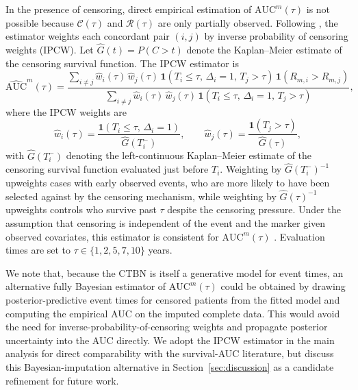 \documentclass[12pt]{article}
\begin{document}
In the presence of censoring, direct empirical estimation of $\mathrm{AUC}^m(\tau)$ is not possible because $\mathcal{C}(\tau)$ and $\mathcal{R}(\tau)$ are only partially observed. Following \citet{BlancheCommengesJacqmin-Gadda2013}, the estimator weights each concordant pair $(i,j)$ by inverse probability of censoring weights (IPCW). Let $\hat{G}(t) = P(C > t)$ denote the Kaplan--Meier estimate of the censoring survival function. The IPCW estimator is
\[
\widehat{\mathrm{AUC}}^m(\tau) = \frac{\displaystyle\sum_{i \neq j} \hat{w}_i(\tau)\, \hat{w}_j(\tau)\, \mathbf{1}(T_i \leq \tau,\, \Delta_i = 1,\, T_j > \tau)\, \mathbf{1}(R_{m,i} > R_{m,j})}{\displaystyle\sum_{i \neq j} \hat{w}_i(\tau)\, \hat{w}_j(\tau)\, \mathbf{1}(T_i \leq \tau,\, \Delta_i = 1,\, T_j > \tau)},
\]
where the IPCW weights are
\[
\hat{w}_i(\tau) = \frac{\mathbf{1}(T_i \leq \tau,\, \Delta_i = 1)}{\hat{G}(T_i^-)}, \qquad
\hat{w}_j(\tau) = \frac{\mathbf{1}(T_j > \tau)}{\hat{G}(\tau)},
\]
with $\hat{G}(T_i^-)$ denoting the left-continuous Kaplan--Meier estimate of the censoring survival function evaluated just before $T_i$. Weighting by $\hat{G}(T_i^-)^{-1}$ upweights cases with early observed events, who are more likely to have been selected against by the censoring mechanism, while weighting by $\hat{G}(\tau)^{-1}$ upweights controls who survive past $\tau$ despite the censoring pressure. Under the assumption that censoring is independent of the event and the marker given observed covariates, this estimator is consistent for $\mathrm{AUC}^m(\tau)$ \citep{BlancheCommengesJacqmin-Gadda2013}. Evaluation times are set to $\tau \in \{1, 2, 5, 7, 10\}$ years.

We note that, because the CTBN is itself a generative model for event times, an alternative fully Bayesian estimator of $\mathrm{AUC}^m(\tau)$ could be obtained by drawing posterior-predictive event times for censored patients from the fitted model and computing the empirical AUC on the imputed complete data. This would avoid the need for inverse-probability-of-censoring weights and propagate posterior uncertainty into the AUC directly. We adopt the IPCW estimator in the main analysis for direct comparability with the survival-AUC literature, but discuss this Bayesian-imputation alternative in Section~\ref{sec:discussion} as a candidate refinement for future work.
\end{document}
